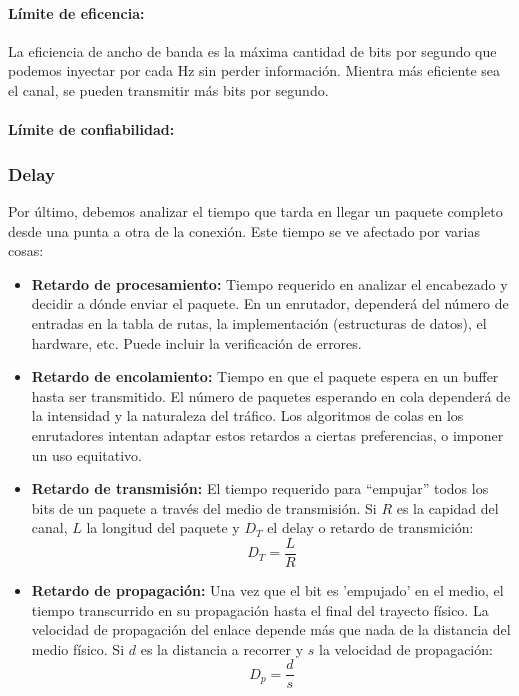\paragraph{Límite de eficencia:} La eficiencia de ancho de banda es la máxima cantidad de bits por segundo que podemos inyectar por cada Hz sin perder información. Mientra más eficiente sea el canal, se pueden transmitir más bits por segundo. 

\paragraph{Límite de confiabilidad:} 

\subsubsection{Delay}
Por último, debemos analizar el tiempo que tarda en llegar un paquete completo desde una punta a otra de la conexión. Este tiempo se ve afectado por varias cosas:
  \begin{itemize}
    \item \textbf{Retardo de procesamiento:} Tiempo requerido en analizar el encabezado y decidir a dónde enviar el paquete. En un enrutador, dependerá del número de entradas en la tabla de rutas, la implementación (estructuras de datos), el hardware, etc. Puede incluir la verificación de errores.
    \item \textbf{Retardo de encolamiento:} Tiempo en que el paquete espera en un buffer hasta ser transmitido. El número de paquetes esperando en cola dependerá de la intensidad y la naturaleza del tráfico. Los algoritmos de colas en los enrutadores intentan adaptar estos retardos a ciertas preferencias, o imponer un uso equitativo.
    \item \textbf{Retardo de transmisión:} El tiempo requerido para “empujar” todos los bits de un paquete a través del medio de transmisión. Si \(R\) es la capidad del canal, \(L\) la longitud del paquete y \(D_T\) el delay o retardo de transmición:
    \[D_T = \frac{L}{R}\]
    \item \textbf{Retardo de propagación:} Una vez que el bit es 'empujado' en el medio, el tiempo transcurrido en su propagación hasta
    el final del trayecto físico. La velocidad de propagación del enlace depende más que nada de la distancia del medio físico. Si \(d\) es la distancia a recorrer y \(s\) la velocidad de propagación:
    \[D_p = \frac{d}{s}\]
  \end{itemize}

